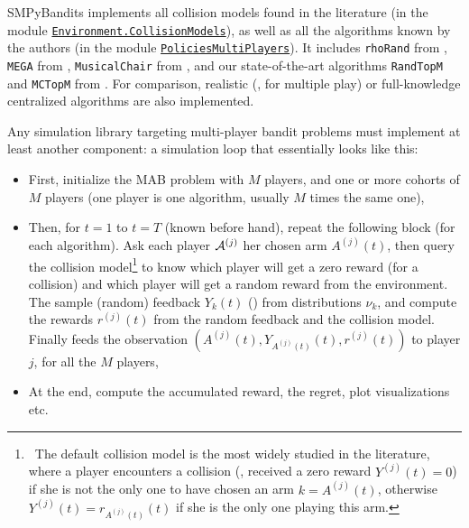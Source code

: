 SMPyBandits implements all collision models found in the literature (in the module \texttt{\href{https://SMPyBandits.GitHub.io/docs/Environment.CollisionModels.html}{Environment.CollisionModels}}), as well as all the algorithms known by the authors (in the module \texttt{\href{https://SMPyBandits.GitHub.io/docs/PoliciesMultiPlayers.html}{PoliciesMultiPlayers}}).
%
It includes
\texttt{rhoRand}
from \cite{Anandkumar11},
\texttt{MEGA}
from \cite{Avner15},
\texttt{MusicalChair}
from \cite{Rosenski16},
and our state-of-the-art algorithms
\texttt{RandTopM}
and \texttt{MCTopM}
from \cite{Besson2018ALT}.
For comparison, realistic (\eg, \UCB{} for multiple play) or full-knowledge centralized algorithms are also implemented.

Any simulation library targeting multi-player bandit problems must implement at least another component:
a simulation loop that essentially looks like this:
\begin{itemize}
    \item First, initialize the MAB problem with $M$ players, and one or more cohorts of $M$ players (one player is one algorithm, usually $M$ times the same one),
    \item Then, for $t=1$ to $t=T$ (known before hand), repeat the following block (for each algorithm). Ask each player $\mathcal{A}^{(j)}$ her chosen arm $A^{(j)}(t)$, then query the collision model\footnote{~The default collision model is the most widely studied in the literature, where a player encounters a collision (\ie, received a zero reward $Y^{(j)}(t)=0$) if she is not the only one to have chosen an arm $k=A^{(j)}(t)$, otherwise $Y^{(j)}(t)=r_{A^{(j)}(t)}(t)$ if she is the only one playing this arm.} to know which player will get a zero reward (for a collision) and which player will get a random reward from the environment. The
    sample (random) feedback $Y_k(t)$ (\iid) from distributions $\nu_{k}$, and compute the rewards $r^{(j)}(t)$ from the random feedback and the collision model. Finally feeds the observation $(A^{(j)}(t), Y_{A^{(j)}(t)}(t), r^{(j)}(t))$ to player $j$, for all the $M$ players,
    \item At the end, compute the accumulated reward, the regret, plot visualizations etc.
\end{itemize}


